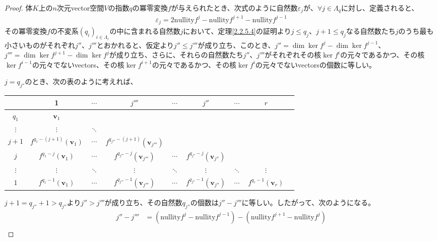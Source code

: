 \documentclass[dvipdfmx]{jsarticle}
\begin{document}
\begin{proof}
体$K$上の$n$次元vector空間$V$の指数$q$の冪零変換$f$が与えられたとき、次式のように自然数$\varepsilon_{j}$が、$\forall j \in \varLambda_{q}$に対し、定義されると、
\begin{align*}
\varepsilon_{j} = 2{\mathrm{nullity}}f^{j} - {\mathrm{nullity}}f^{j + 1} - {\mathrm{nullity}}f^{j - 1}
\end{align*}
その冪零変換$f$の不変系$\left( q_{i} \right)_{i \in \varLambda_{r}}$の中に含まれる自然数$j$において、定理\ref{2.2.5.4}の証明より$j \leq q_{j}$、$j + 1 \leq q_{j}$なる自然数たち$j$のうち最も小さいものがそれぞれ$j''$、$j'''$とおかれると、仮定より$j'' \leq j'''$が成り立ち、このとき、$j'' = \dim{\ker f^{j}} - \dim{\ker f^{j - 1}}$、$j''' = \dim{\ker f^{j + 1}} - \dim{\ker f^{j}}$が成り立ち、さらに、それらの自然数たち$j''$、$j'''$がそれぞれその核$\ker f^{i}$の元々であるかつ、その核$\ker f^{i - 1}$の元々でないvectors、その核$\ker f^{i + 1}$の元々であるかつ、その核$\ker f^{i}$の元々でないvectorsの個数に等しい。\par
$j = q_{j''}$のとき、次の表のように考えれば、
\begin{longtable}[c]{c|cccccccc}
&1&$\cdots$&$j'''$&$\cdots$&$j''$&$\cdots$&$r$ \\
\hline
$q_{1}$ & $\mathbf{v}_{1}$ & & & & & & \\
$\vdots$ & $\vdots$ & $\ddots$ & & & & & \\
$j + 1$ & $f^{q_{1} - (j + 1)}\left( \mathbf{v}_{1} \right)$ & $\cdots$ & $f^{q_{j'''} - (j + 1)}\left( \mathbf{v}_{j'''} \right)$ & & & & \\
$j$ & $f^{q_{1} - j}\left( \mathbf{v}_{1} \right)$ & $\cdots$ & $f^{q_{j'''} - j}\left( \mathbf{v}_{j'''} \right)$ & \cellcolor{lightgray} $\cdots$ & \cellcolor{lightgray} $f^{q_{j''} - j}\left( \mathbf{v}_{j''} \right)$ & & \\
$\vdots$ & $\vdots$ & $\ddots$ & $\vdots$ & $\ddots$ & $\vdots$ & $\ddots$ & $\vdots$ \\
$1$ & $f^{q_{1} - 1}\left( \mathbf{v}_{1} \right)$ & $\cdots$ & $f^{q_{j'''} - 1}\left( \mathbf{v}_{j'''} \right)$ & $\cdots$ & $f^{q_{j''} - 1}\left( \mathbf{v}_{j''} \right)$ & $\cdots$ & $f^{q_{r} - 1}\left( \mathbf{v}_{r} \right)$ \\
\end{longtable}
$j + 1 = q_{j''} + 1 > q_{j''}$より$j'' > j'''$が成り立ち、その自然数$q_{j''}$の個数は$j'' - j'''$に等しい。したがって、次のようになる。
\begin{align*}
j'' - j''' &= \left( {\mathrm{nullity}}f^{j} - {\mathrm{nullity}}f^{j - 1} \right) - \left( {\mathrm{nullity}}f^{j + 1} - {\mathrm{nullity}}f^{j} \right)\\

\end{align*}
\end{proof}
\end{document}

